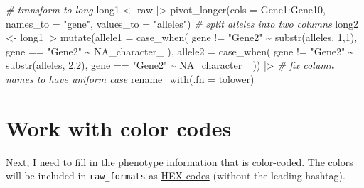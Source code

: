 \documentclass[
]{book}
\newenvironment{Shaded}{\begin{snugshade}}{\end{snugshade}}
\newcommand{\AttributeTok}[1]{\textcolor[rgb]{0.77,0.63,0.00}{#1}}
\newcommand{\CommentTok}[1]{\textcolor[rgb]{0.56,0.35,0.01}{\textit{#1}}}
\newcommand{\ConstantTok}[1]{\textcolor[rgb]{0.00,0.00,0.00}{#1}}
\newcommand{\DecValTok}[1]{\textcolor[rgb]{0.00,0.00,0.81}{#1}}
\newcommand{\FunctionTok}[1]{\textcolor[rgb]{0.00,0.00,0.00}{#1}}
\newcommand{\NormalTok}[1]{#1}
\newcommand{\OtherTok}[1]{\textcolor[rgb]{0.56,0.35,0.01}{#1}}
\newcommand{\SpecialCharTok}[1]{\textcolor[rgb]{0.00,0.00,0.00}{#1}}
\newcommand{\StringTok}[1]{\textcolor[rgb]{0.31,0.60,0.02}{#1}}
\begin{document}
\begin{Shaded}
\begin{Highlighting}[]
\CommentTok{\# transform to long}
\NormalTok{long1 }\OtherTok{\textless{}{-}}\NormalTok{ raw }\SpecialCharTok{|\textgreater{}} 
  \FunctionTok{pivot\_longer}\NormalTok{(}\AttributeTok{cols =}\NormalTok{ Gene1}\SpecialCharTok{:}\NormalTok{Gene10,}
               \AttributeTok{names\_to =} \StringTok{"gene"}\NormalTok{,}
               \AttributeTok{values\_to =} \StringTok{"alleles"}\NormalTok{)}
\CommentTok{\# split alleles into two columns  }
\NormalTok{long2 }\OtherTok{\textless{}{-}}\NormalTok{ long1 }\SpecialCharTok{|\textgreater{}} 
  \FunctionTok{mutate}\NormalTok{(}\AttributeTok{allele1 =} \FunctionTok{case\_when}\NormalTok{(}
\NormalTok{    gene }\SpecialCharTok{!=} \StringTok{"Gene2"} \SpecialCharTok{\textasciitilde{}} \FunctionTok{substr}\NormalTok{(alleles, }\DecValTok{1}\NormalTok{,}\DecValTok{1}\NormalTok{),}
\NormalTok{    gene }\SpecialCharTok{==} \StringTok{"Gene2"} \SpecialCharTok{\textasciitilde{}} \ConstantTok{NA\_character\_}
\NormalTok{  ),}
  \AttributeTok{allele2  =} \FunctionTok{case\_when}\NormalTok{(}
\NormalTok{    gene }\SpecialCharTok{!=} \StringTok{"Gene2"} \SpecialCharTok{\textasciitilde{}} \FunctionTok{substr}\NormalTok{(alleles, }\DecValTok{2}\NormalTok{,}\DecValTok{2}\NormalTok{),}
\NormalTok{    gene }\SpecialCharTok{==} \StringTok{"Gene2"} \SpecialCharTok{\textasciitilde{}} \ConstantTok{NA\_character\_}
\NormalTok{  )) }\SpecialCharTok{|\textgreater{}} 
  \CommentTok{\# fix column names to have uniform case }
  \FunctionTok{rename\_with}\NormalTok{(}\AttributeTok{.fn =}\NormalTok{ tolower) }
\end{Highlighting}
\end{Shaded}

\hypertarget{work-with-color-codes}{%
\section{Work with color codes}\label{work-with-color-codes}}

Next, I need to fill in the phenotype information that is color-coded. The colors will be included in \texttt{raw\_formats} as \href{https://www.makeuseof.com/hex-code-what-is-it/}{HEX codes} (without the leading hashtag).

\begin{Shaded}
\end{Shaded}
\end{document}

